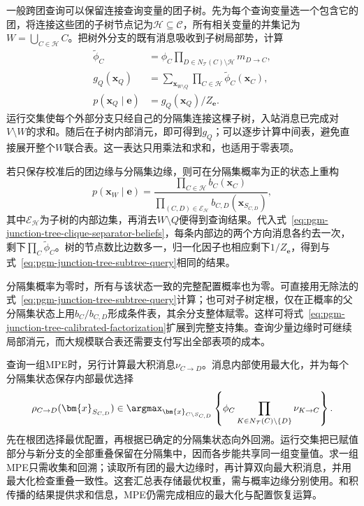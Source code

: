 一般跨团查询可以保留连接查询变量的团子树。先为每个查询变量选一个包含它的团，将连接这些团的子树节点记为$\mathcal H\subseteq\mathcal C$，所有相关变量的并集记为$W=\bigcup_{C\in\mathcal H}C$。把树外分支的既有消息吸收到子树局部势，计算
\begin{equation}
  \begin{aligned}
    \widetilde{\phi}_C
      &=\phi_C
        \prod_{D\in N_{\mathcal{T}}(C)\setminus\mathcal{H}}m_{D\to C},\\
    g_Q(\bm{x}_Q)
      &=\sum_{\bm{x}_{W\setminus Q}}
         \prod_{C\in\mathcal{H}}\widetilde{\phi}_C(\bm{x}_C),\\
    p(\bm{x}_Q\mid\bm{e})&=g_Q(\bm{x}_Q)/Z_{\bm{e}}.
  \end{aligned}
  \label{eq:pgm-junction-tree-subtree-query}
\end{equation}
运行交集使每个外部分支只经自己的分隔集连接这棵子树，入站消息已完成对$V\setminus W$的求和。随后在子树内部消元，即可得到$g_Q$；可以逐步计算中间表，避免直接展开整个$W$联合表。这一表达只用乘法和求和，也适用于零表项。

若只保存校准后的团边缘与分隔集边缘，则可在分隔集概率为正的状态上重构
\begin{equation}
  p(\bm{x}_W\mid\bm{e})
    =\frac{\prod_{C\in\mathcal{H}}b_C(\bm{x}_C)}
           {\prod_{(C,D)\in\mathcal{E}_{\mathcal{H}}}
                b_{C,D}(\bm{x}_{S_{C,D}})},
  \label{eq:pgm-junction-tree-calibrated-factorization}
\end{equation}
其中$\mathcal E_{\mathcal H}$为子树的内部边集，再消去$W\setminus Q$便得到查询结果。代入式~\eqref{eq:pgm-junction-tree-clique-separator-beliefs}，每条内部边的两个方向消息各约去一次，剩下$\prod_C\widetilde\phi_C$。树的节点数比边数多一，归一化因子也相应剩下$1/Z_{\bm e}$，得到与式~\eqref{eq:pgm-junction-tree-subtree-query}相同的结果。

分隔集概率为零时，所有与该状态一致的完整配置概率也为零。可直接用无除法的式~\eqref{eq:pgm-junction-tree-subtree-query}计算；也可对子树定根，仅在正概率的父分隔集状态上用$b_C/b_{C,D}$形成条件表，其余分支整体赋零。这样可将式~\eqref{eq:pgm-junction-tree-calibrated-factorization}扩展到完整支持集。查询少量边缘时可继续局部消元，而大规模联合表还需要支付写出全部表项的成本。

查询一组MPE时，另行计算最大积消息$\nu_{C\to D}$。消息内部使用最大化，并为每个分隔集状态保存内部最优选择
\begin{equation}
  \rho_{C\to D}(\bm{x}_{S_{C,D}})
    \in\argmax_{\bm{x}_{C\setminus S_{C,D}}}
       \left\{\phi_C
          \prod_{K\in N_{\mathcal{T}}(C)\setminus\{D\}}\nu_{K\to C}\right\}.
  \label{eq:pgm-junction-tree-clique-backpointer}
\end{equation}
先在根团选择最优配置，再根据已确定的分隔集状态向外回溯。运行交集把已赋值部分与新分支的全部重叠保留在分隔集中，因而各步能共享同一组变量值。求一组MPE只需收集和回溯；读取所有团的最大边缘时，再计算双向最大积消息，并用最大化检查重叠一致性。这套汇总表存储最优权重，需与概率边缘分别使用。和积传播的结果提供求和信息，MPE仍需完成相应的最大化与配置恢复运算。

